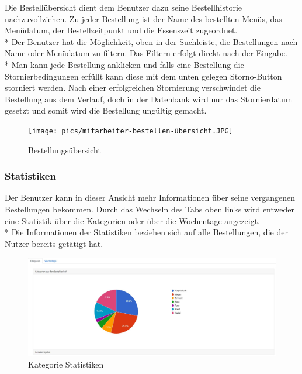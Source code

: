 Die Bestellübersicht dient dem Benutzer dazu seine Bestellhistorie nachzuvollziehen. Zu jeder Bestellung ist der Name des bestellten Menüs, das Menüdatum, der Bestellzeitpunkt und die Essenszeit zugeordnet. \\*
Der Benutzer hat die Möglichkeit, oben in der Suchleiste, die Bestellungen nach Name oder Menüdatum zu filtern. Das Filtern erfolgt direkt nach der Eingabe. \\*
Man kann jede Bestellung anklicken und falls eine Bestellung die Stornierbedingungen erfüllt kann diese mit dem unten gelegen Storno-Button storniert werden.
Nach einer erfolgreichen Stornierung verschwindet die Bestellung aus dem Verlauf, doch in der Datenbank wird nur das Stornierdatum gesetzt und somit wird die Bestellung ungültig gemacht. 


\begin{figure}[htp]
    \centering
    \texttt{[image: pics/mitarbeiter-bestellen-übersicht.JPG]}
    \caption{Bestellungsübersicht}
    \label{fig:impl:BestellenMitarbeiterUebersicht}
\end{figure}
\pagebreak

\subsubsection {Statistiken}

Der Benutzer kann in dieser Ansicht mehr Informationen über seine vergangenen Bestellungen bekommen.
Durch das Wechseln des Tabs oben links wird entweder eine Statistik über die Kategorien oder über die Wochentage angezeigt. \\*
Die Informationen der Statistiken beziehen sich auf alle Bestellungen, die der Nutzer bereits getätigt hat.

\begin{figure}[htp]
    \centering
    \includegraphics[scale=0.3]{pics/statistiken_kategorien.JPG}
    \caption{Kategorie Statistiken}
    \label{fig:impl:StatsCategories}
\end{figure}

